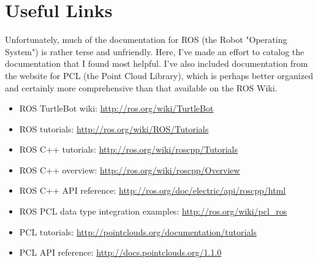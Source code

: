 \documentclass[12pt]{report}
\begin{document}
\section{Useful Links}
Unfortunately, much of the documentation for ROS (the Robot "Operating System") is rather terse and unfriendly.  Here, I've made an effort to catalog the documentation that I found most helpful.  I've also included documentation from the website for PCL (the Point Cloud Library), which is perhaps better organized and certainly more comprehensive than that available on the ROS Wiki.
\begin{itemize}
\item{ROS TurtleBot wiki: \url{http://ros.org/wiki/TurtleBot}}
\item{ROS tutorials: \url{http://ros.org/wiki/ROS/Tutorials}}
\item{ROS C++ tutorials: \url{http://ros.org/wiki/roscpp/Tutorials}}
\item{ROS C++ overview: \url{http://ros.org/wiki/roscpp/Overview}}
\item{ROS C++ API reference: \url{http://ros.org/doc/electric/api/roscpp/html}}
\item{ROS PCL data type integration examples: \url{http://ros.org/wiki/pcl_ros}}
\item{PCL tutorials: \url{http://pointclouds.org/documentation/tutorials}}
\item{PCL API reference: \url{http://docs.pointclouds.org/1.1.0}}
\end{itemize}
\end{document}

